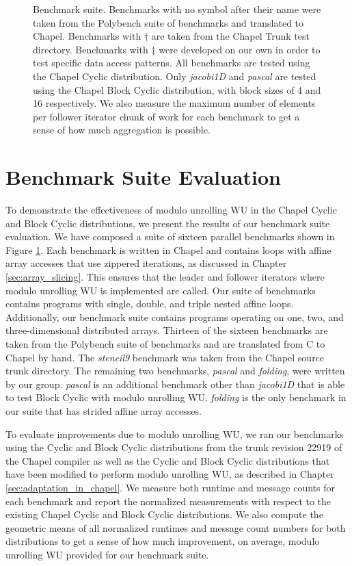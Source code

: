 \begin{figure}
\begin{center}
\small\normalsize
\begin{quote}
\caption[Benchmark suite]{Benchmark suite. Benchmarks with no symbol after their name were taken from the Polybench suite of benchmarks and translated to Chapel. Benchmarks with $\dagger$ are taken from the Chapel Trunk test directory. Benchmarks with $\ddagger$ were developed on our own in order to test specific data access patterns. All benchmarks are tested using the Chapel Cyclic distribution. Only \textit{jacobi1D} and \textit{pascal} are tested using the Chapel Block Cyclic distribution, with block sizes of 4 and 16 respectively. We also measure the maximum number of elements per follower iterator chunk of work for each benchmark to get a sense of how much aggregation is possible.\label{benchmarks}}
\end{quote}
\end{center}
\end{figure}

\section{Benchmark Suite Evaluation}\label{sec:benchmark_suite_evaluation}

To demonstrate the effectiveness of modulo unrolling WU in the Chapel Cyclic and Block Cyclic distributions, we present the results of our benchmark suite evaluation. We have composed a suite of sixteen parallel benchmarks shown in Figure \ref{benchmarks}. Each benchmark is written in Chapel and contains loops with affine array accesses that use zippered iterations, as discussed in Chapter \ref{sec:array_slicing}. This ensures that the leader and follower iterators where modulo unrolling WU is implemented are called. Our suite of benchmarks contains programs with single, double, and triple nested affine loops. Additionally, our benchmark suite contains programs operating on one, two, and three-dimensional distributed arrays. Thirteen of the sixteen benchmarks are taken from the Polybench suite of benchmarks \cite{polybench} and are translated from C to Chapel by hand. The \textit{stencil9} benchmark was taken from the Chapel source trunk directory. The remaining two benchmarks, \textit{pascal} and \textit{folding}, were written by our group. \textit{pascal} is an additional benchmark other than \textit{jacobi1D} that is able to test Block Cyclic with modulo unrolling WU. \textit{folding} is the only benchmark in our suite that has strided affine array accesses. 

To evaluate improvements due to modulo unrolling WU, we ran our benchmarks using the Cyclic and Block Cyclic distributions from the trunk revision 22919 of the Chapel compiler as well as the Cyclic and Block Cyclic distributions that have been modified to perform modulo unrolling WU, as described in Chapter \ref{sec:adaptation_in_chapel}. We measure both runtime and message counts for each benchmark and report the normalized measurements with respect to the existing Chapel Cyclic and Block Cyclic distributions. We also compute the geometric means of all normalized runtimes and message count numbers for both distributions to get a sense of how much improvement, on average, modulo unrolling WU provided for our benchmark suite. 

